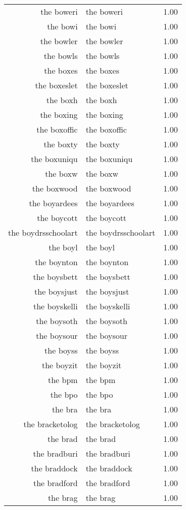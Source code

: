 \begin{table}[ht]
\begin{tabular}{rlr}
  the boweri & the boweri & 1.00 \\ 
  the bowi & the bowi & 1.00 \\ 
  the bowler & the bowler & 1.00 \\ 
  the bowls & the bowls & 1.00 \\ 
  the boxes & the boxes & 1.00 \\ 
  the boxeslet & the boxeslet & 1.00 \\ 
  the boxh & the boxh & 1.00 \\ 
  the boxing & the boxing & 1.00 \\ 
  the boxoffic & the boxoffic & 1.00 \\ 
  the boxty & the boxty & 1.00 \\ 
  the boxuniqu & the boxuniqu & 1.00 \\ 
  the boxw & the boxw & 1.00 \\ 
  the boxwood & the boxwood & 1.00 \\ 
  the boyardees & the boyardees & 1.00 \\ 
  the boycott & the boycott & 1.00 \\ 
  the boydrsschoolart & the boydrsschoolart & 1.00 \\ 
  the boyl & the boyl & 1.00 \\ 
  the boynton & the boynton & 1.00 \\ 
  the boysbett & the boysbett & 1.00 \\ 
  the boysjust & the boysjust & 1.00 \\ 
  the boyskelli & the boyskelli & 1.00 \\ 
  the boysoth & the boysoth & 1.00 \\ 
  the boysour & the boysour & 1.00 \\ 
  the boyss & the boyss & 1.00 \\ 
  the boyzit & the boyzit & 1.00 \\ 
  the bpm & the bpm & 1.00 \\ 
  the bpo & the bpo & 1.00 \\ 
  the bra & the bra & 1.00 \\ 
  the bracketolog & the bracketolog & 1.00 \\ 
  the brad & the brad & 1.00 \\ 
  the bradburi & the bradburi & 1.00 \\ 
  the braddock & the braddock & 1.00 \\ 
  the bradford & the bradford & 1.00 \\ 
  the brag & the brag & 1.00 \\ 

\end{tabular}
\end{table}
